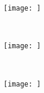 
\begin{figure}[H]
	\centering
    \begin{subfigure}[b]{0.3\textwidth}
        \texttt{[image: ]}
        \caption{}
        \label{fig:}
    \end{subfigure}
    ~
	\begin{subfigure}[b]{0.3\textwidth}
        \texttt{[image: ]}
        \caption{}
        \label{fig:}
    \end{subfigure}
    ~
    \begin{subfigure}[b]{0.3\textwidth}
        \texttt{[image: ]}
        \caption{}
        \label{fig:}
    \end{subfigure}
    ~
    \caption{}
    \label{fig:}
\end{figure}
